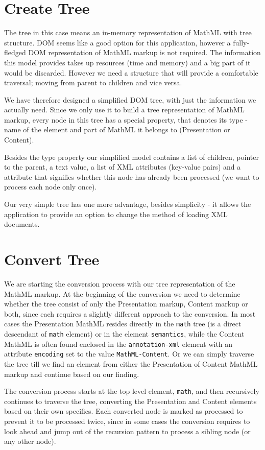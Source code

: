 \documentclass[11pt,oneside,final]{fithesis2}
\begin{document}
\section{Create Tree}
\label{section:createtree}
The tree in this case means an in-memory representation of MathML with tree structure. DOM seems like a good option for this application, however a fully-fledged DOM representation of MathML markup is not required. The information this model provides takes up resources (time and memory) and a big part of it would be discarded. However we need a structure that will provide a comfortable traversal; moving from parent to children and vice versa.

We have therefore designed a simplified DOM tree, with just the information we actually need. Since we only use it to build a tree representation of MathML markup, every node in this tree has a special property, that denotes its type - name of the element and part of MathML it belongs to (Presentation or Content). 

Besides the type property our simplified model contains a list of children, pointer to the parent, a text value, a list of XML attributes (key-value pairs) and a attribute that signifies whether this node has already been processed (we want to process each node only once).

Our very simple tree has one more advantage, besides simplicity - it allows the application to provide an option to change the method of loading XML documents.

\section{Convert Tree}
We are starting the conversion process with our tree representation of the MathML markup. At the beginning of the conversion we need to determine whether the tree consist of only the Presentation markup, Content markup or both, since each requires a slightly different approach to the conversion. In most cases the Presentation MathML resides directly in the \texttt{math} tree (is a direct descendant of \texttt{math} element) or in the element \texttt{semantics}, while the Content MathML is often found enclosed in the \texttt{annotation-xml} element with an attribute \texttt{encoding} set to the value \texttt{MathML-Content}. Or we can simply traverse the tree till we find an element from either the Presentation of Content MathML markup and continue based on our finding.

The conversion process starts at the top level element, \texttt{math}, and then recursively continues to traverse the tree, converting the Presentation and Content elements based on their own specifics. Each converted node is marked as processed to prevent it to be processed twice, since in some cases the conversion requires to look ahead and jump out of the recursion pattern to process a sibling node (or any other node).
\end{document}
